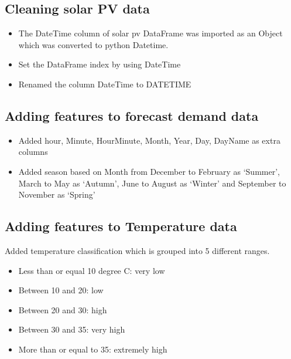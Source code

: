 \documentclass[mstat,12pt]{unswthesis}
\begin{document}
\hypertarget{cleaning-solar-pv-data}{%
\subsection{Cleaning solar PV data}\label{cleaning-solar-pv-data}}

\begin{itemize}
\item The DateTime column of solar pv DataFrame was imported as an Object which was converted to python Datetime. 
\item Set the DataFrame index by using DateTime 
\item Renamed the column DateTime to DATETIME
\end{itemize}

\hypertarget{adding-features-to-forecast-demand-data}{%
\subsection{Adding features to forecast demand
data}\label{adding-features-to-forecast-demand-data}}

\begin{itemize}
\item Added hour, Minute, HourMinute, Month, Year, Day, DayName as extra columns
\item Added season based on Month from December to February as ‘Summer’, March to May as ‘Autumn’, June to August as ‘Winter’ and September to November as ‘Spring’
\end{itemize}

\hypertarget{adding-features-to-temperature-data}{%
\subsection{Adding features to Temperature
data}\label{adding-features-to-temperature-data}}

Added temperature classification which is grouped into 5 different
ranges.

\begin{itemize}
\item Less than or equal 10 degree C: very low
\item Between 10 and 20: low
\item Between 20 and 30: high
\item Between 30 and 35: very high
\item More than or equal to 35: extremely high
\end{itemize}
\end{document}
